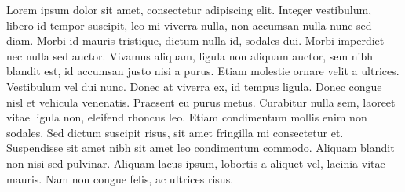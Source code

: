 Lorem ipsum dolor sit amet, consectetur adipiscing elit. Integer vestibulum, libero id tempor suscipit, leo mi viverra nulla, non accumsan nulla nunc sed diam. Morbi id mauris tristique, dictum nulla id, sodales dui. Morbi imperdiet nec nulla sed auctor. Vivamus aliquam, ligula non aliquam auctor, sem nibh blandit est, id accumsan justo nisi a purus. Etiam molestie ornare velit a ultrices. Vestibulum vel dui nunc. Donec at viverra ex, id tempus ligula. Donec congue nisl et vehicula venenatis. Praesent eu purus metus. Curabitur nulla sem, laoreet vitae ligula non, eleifend rhoncus leo. Etiam condimentum mollis enim non sodales. Sed dictum suscipit risus, sit amet fringilla mi consectetur et. Suspendisse sit amet nibh sit amet leo condimentum commodo. Aliquam blandit non nisi sed pulvinar. Aliquam lacus ipsum, lobortis a aliquet vel, lacinia vitae mauris. Nam non congue felis, ac ultrices risus.